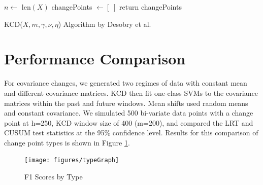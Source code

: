 \documentclass[conference,letterpaper]{IEEEtran}
\begin{document}
\begin{function}
	\SetAlgoLined
	$n \gets$ len$(X)$ \;
	\BlankLine
	changePoints $\gets [ \; ]$ \;
	\BlankLine
	return changePoints
 \caption{KCD($X, m, \gamma, \nu, \eta$) Algorithm by Desobry et al.\cite{1468491}}
\end{function}

\section{Performance Comparison}

For covariance changes, we generated two regimes of data with constant mean and different covariance matrices. 
KCD then fit one-class SVMs to the covariance matrices within the past and future windows. 
Mean shifts used random means and constant covariance.
We simulated 500 bi-variate data points with a change point at h=250, KCD window size of 400 (m=200), and compared the LRT and CUSUM test statistics at the 95\% confidence level.
Results for this comparison of change point types is shown in Figure \ref{fig:f1ScoresType}.

\begin{figure}[htbp]
\begin{center}
\texttt{[image: figures/typeGraph]}
\caption{F1 Scores by Type}
\label{fig:f1ScoresType}
\end{center}
\end{figure}
\end{document}
